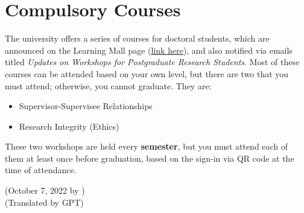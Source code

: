 \section{Compulsory Courses}
The university offers a series of courses for doctoral students, which are announced on the Learning Mall page (\href{https://core.xjtlu.edu.cn/course/view.php?id=847}{link here}), and also notified via emails titled \textit{Updates on Workshops for Postgraduate Research Students}. Most of these courses can be attended based on your own level, but there are two that you must attend; otherwise, you cannot graduate. They are:

\begin{itemize}
    \item Supervisor-Supervisee Relationships
    \item Research Integrity (Ethics)
\end{itemize}

These two workshops are held every \textbf{semester}, but you must attend each of them at least once before graduation, based on the sign-in via QR code at the time of attendance.

\begin{flushright}
(October 7, 2022 by \Wu) \\
(Translated by GPT)
\end{flushright}